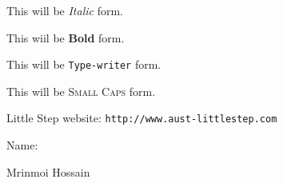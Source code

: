 \documentclass[11pt]{article}
\begin{document}
This will be \textit{Italic} form.

This wiil be \textbf{Bold} form.

This will be \texttt{Type-writer} form.

This will be \textsc{Small Caps} form.

Little Step website: \texttt{http://www.aust-littlestep.com}

Name: \begin{large}Mrinmoi Hossain\end{large}
\end{document}
